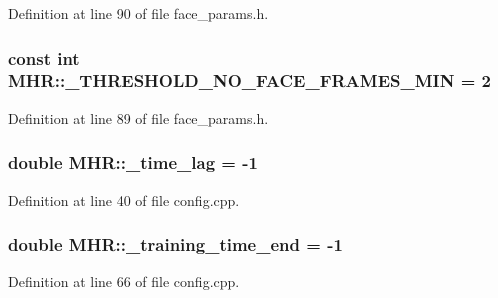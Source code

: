Definition at line 90 of file face\+\_\+params.\+h.

\hypertarget{namespace_m_h_r_adc786b108805d8d2ad944595ea2b7092}{
\subsubsection[{\+\_\+\+T\+H\+R\+E\+S\+H\+O\+L\+D\+\_\+\+N\+O\+\_\+\+F\+A\+C\+E\+\_\+\+F\+R\+A\+M\+E\+S\+\_\+\+M\+I\+N}]{\setlength{\rightskip}{0pt plus 5cm}const int M\+H\+R\+::\+\_\+\+T\+H\+R\+E\+S\+H\+O\+L\+D\+\_\+\+N\+O\+\_\+\+F\+A\+C\+E\+\_\+\+F\+R\+A\+M\+E\+S\+\_\+\+M\+I\+N = 2}}\label{namespace_m_h_r_adc786b108805d8d2ad944595ea2b7092}


Definition at line 89 of file face\+\_\+params.\+h.

\hypertarget{namespace_m_h_r_abe9f5a6b09e1219712f2b5912e68506d}{
\subsubsection[{\+\_\+time\+\_\+lag}]{\setlength{\rightskip}{0pt plus 5cm}double M\+H\+R\+::\+\_\+time\+\_\+lag = -\/1}}\label{namespace_m_h_r_abe9f5a6b09e1219712f2b5912e68506d}


Definition at line 40 of file config.\+cpp.

\hypertarget{namespace_m_h_r_a6ee9276234c51d213a3b1631eee5f315}{
\subsubsection[{\+\_\+training\+\_\+time\+\_\+end}]{\setlength{\rightskip}{0pt plus 5cm}double M\+H\+R\+::\+\_\+training\+\_\+time\+\_\+end = -\/1}}\label{namespace_m_h_r_a6ee9276234c51d213a3b1631eee5f315}


Definition at line 66 of file config.\+cpp.

